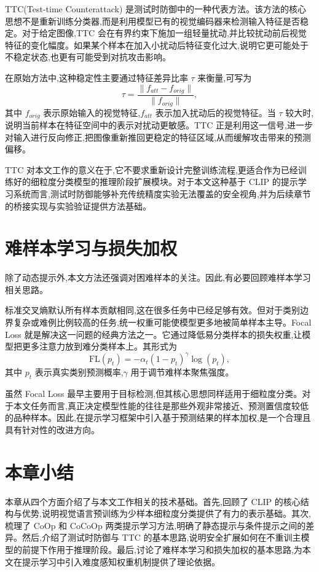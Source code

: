 TTC(Test-time Counterattack) 是测试时防御中的一种代表方法\cite{xing2025ttc}。该方法的核心思想不是重新训练分类器,而是利用模型已有的视觉编码器来检测输入特征是否稳定。对于给定图像,TTC 会在有界约束下施加一组轻量扰动,并比较扰动前后视觉特征的变化幅度。如果某个样本在加入小扰动后特征变化过大,说明它更可能处于不稳定状态,也更有可能受到对抗攻击影响。

在原始方法中,这种稳定性主要通过特征差异比率 \(\tau\) 来衡量,可写为
\begin{equation}
\tau = \frac{\lVert f_{att} - f_{orig} \rVert}{\lVert f_{orig} \rVert},
\end{equation}
其中 \(f_{orig}\) 表示原始输入的视觉特征,\(f_{att}\) 表示加入扰动后的视觉特征。当 \(\tau\) 较大时,说明当前样本在特征空间中的表示对扰动更敏感。TTC 正是利用这一信号,进一步对输入进行反向修正,把图像重新推回更稳定的特征区域,从而缓解攻击带来的预测偏移。

TTC 对本文工作的意义在于,它不要求重新设计完整训练流程,更适合作为已经训练好的细粒度分类模型的推理阶段扩展模块。对于本文这种基于 CLIP 的提示学习系统而言,测试时防御能够补充传统精度实验无法覆盖的安全视角,并为后续章节的桥接实现与实验验证提供方法基础。

\section{难样本学习与损失加权}

除了动态提示外,本文方法还强调对困难样本的关注。因此,有必要回顾难样本学习相关思路。

标准交叉熵默认所有样本贡献相同,这在很多任务中已经足够有效。但对于类别边界复杂或难例比例较高的任务,统一权重可能使模型更多地被简单样本主导。Focal Loss 就是解决这一问题的经典方法之一\cite{lin2017focal}。它通过降低易分类样本的损失权重,让模型把更多注意力放到难分类样本上。其形式为
\begin{equation}
\mathrm{FL}(p_t) = -\alpha_t (1-p_t)^\gamma \log(p_t),
\end{equation}
其中 \(p_t\) 表示真实类别预测概率,\(\gamma\) 用于调节难样本聚焦强度。

虽然 Focal Loss 最早主要用于目标检测,但其核心思想同样适用于细粒度分类。对于本文任务而言,真正决定模型性能的往往是那些外观非常接近、预测置信度较低的品种样本。因此,在提示学习框架中引入基于预测结果的样本加权,是一个合理且具有针对性的改进方向。

\section{本章小结}

本章从四个方面介绍了与本文工作相关的技术基础。首先,回顾了 CLIP 的核心结构与优势,说明视觉语言预训练为少样本细粒度分类提供了有力的表示基础。其次,梳理了 CoOp 和 CoCoOp 两类提示学习方法,明确了静态提示与条件提示之间的差异。然后,介绍了测试时防御与 TTC 的基本思路,说明安全扩展如何在不重训主模型的前提下作用于推理阶段。最后,讨论了难样本学习和损失加权的基本思路,为本文在提示学习中引入难度感知权重机制提供了理论依据。

